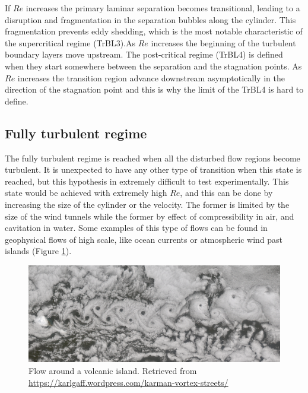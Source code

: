 \documentclass[journal]{new-aiaa}
\begin{document}
If $Re$ increases the primary laminar separation becomes transitional, leading to a disruption and fragmentation in the separation bubbles along the cylinder. This fragmentation prevents eddy shedding, which is the most notable characteristic of the supercritical regime (TrBL3).As $Re$ increases the beginning of the turbulent boundary layers move upstream. The post-critical regime (TrBL4) is defined when they start somewhere between the separation and the stagnation points. As $Re$ increases the transition region advance downstream asymptotically in the direction of the stagnation point and this is why the limit of the TrBL4 is hard to define.




\subsection{Fully turbulent regime}

The fully turbulent regime is reached when all the disturbed flow regions become turbulent. It is unexpected to have any other type of transition when this state is reached, but this hypothesis in extremely difficult to test experimentally. This state would be achieved with extremely high $Re$, and this can be done by increasing the size of the cylinder or the velocity. The former is limited by the size of the wind tunnels while the former by effect of compressibility in air, and cavitation in water. Some examples of this type of flows can be found in geophysical flows of high scale, like ocean currents or atmospheric wind past islands (Figure \ref{fig:T}).

\begin{figure}[H]
\begin{center}
\includegraphics[width=1\textwidth]{Images/federico/Figure07}
\caption{Flow around a volcanic island. Retrieved from  \url{https://karlgaff.wordpress.com/karman-vortex-streets/}}
\label{fig:T}
\end{center}
\end{figure}
\end{document}
